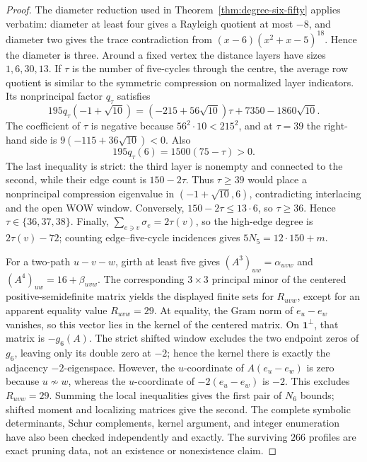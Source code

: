 \documentclass[a4paper,10pt,reqno]{amsart}
\theoremstyle{plain}
\theoremstyle{definition}
\theoremstyle{remark}
\newcommand{\one}{\mathbf 1}
\begin{document}
\begin{proof}
The diameter reduction used in Theorem~\ref{thm:degree-six-fifty} applies
verbatim: diameter at least four gives a Rayleigh quotient at most \(-8\), and
diameter two gives the trace contradiction from
\((x-6)(x^2+x-5)^{18}\).  Hence the diameter is three.  Around a fixed vertex
the distance layers have sizes \(1,6,30,13\).  If \(\tau\) is the number of
five-cycles through the centre, the average row quotient is similar to the
symmetric compression on normalized layer indicators.  Its nonprincipal factor
\(q_\tau\) satisfies
\[
 195q_\tau(-1+\sqrt{10})
 =(-215+56\sqrt{10})\tau+7350-1860\sqrt{10}.
\]
The coefficient of \(\tau\) is negative because
\(56^2\cdot10<215^2\), and at \(\tau=39\) the right-hand side is
\(9(-115+36\sqrt{10})<0\).  Also
\[
 195q_\tau(6)=1500(75-\tau)>0.
\]
The last inequality is strict: the third layer is nonempty and connected to the
second, while their edge count is \(150-2\tau\).  Thus \(\tau\ge39\)
would place a nonprincipal compression eigenvalue in
\((-1+\sqrt{10},6)\), contradicting interlacing and the open WOW window.
Conversely, \(150-2\tau\le13\cdot6\), so \(\tau\ge36\).  Hence
\(\tau\in\{36,37,38\}\).  Finally,
\(\sum_{e\ni v}\sigma_e=2\tau(v)\), so the high-edge degree is
\(2\tau(v)-72\); counting edge--five-cycle incidences gives
\(5N_5=12\cdot150+m\).

For a two-path \(u-v-w\), girth at least five gives
\((A^3)_{uw}=\alpha_{uvw}\) and
\((A^4)_{uw}=16+\beta_{uvw}\).  The corresponding \(3\times3\) principal
minor of the centered positive-semidefinite matrix yields the displayed finite
sets for \(R_{uvw}\), except for an apparent equality value \(R_{uvw}=29\).
At equality, the Gram norm of \(e_u-e_w\) vanishes, so this vector lies in
the kernel of the centered matrix.  On \(\one^\perp\), that matrix is
\(-g_6(A)\).  The strict shifted window excludes the two endpoint zeros of
\(g_6\), leaving only its double zero at \(-2\); hence the kernel there is
exactly the adjacency \(-2\)-eigenspace.  However, the \(u\)-coordinate of
\(A(e_u-e_w)\) is zero because \(u\not\sim w\), whereas the
\(u\)-coordinate of \(-2(e_u-e_w)\) is \(-2\).  This excludes
\(R_{uvw}=29\).  Summing the local inequalities gives the first pair of
\(N_6\) bounds; shifted moment and localizing matrices give the second.
The complete symbolic determinants, Schur complements, kernel argument, and
integer enumeration have also been checked independently and exactly.  The
surviving \(266\) profiles are exact pruning data, not an existence or
nonexistence claim.
\end{proof}
\end{document}
